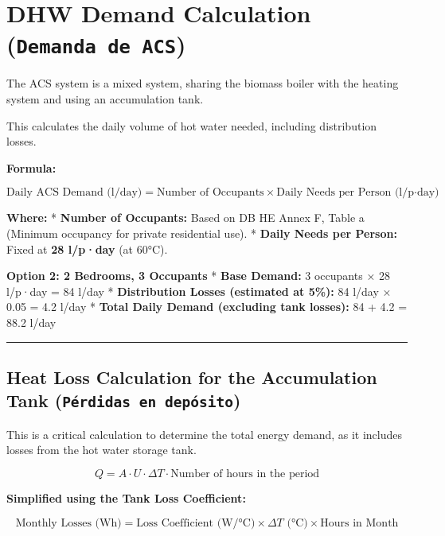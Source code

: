 \documentclass[
  10pt,
  letterpaper,
]{scrbook}
\begin{document}

\chapter{\texorpdfstring{DHW Demand Calculation
(\texttt{Demanda\ de\ ACS})}{DHW Demand Calculation (Demanda de ACS)}}\label{dhw-demand-calculation-demanda-de-acs}

The ACS system is a mixed system, sharing the biomass boiler with the
heating system and using an accumulation tank.

This calculates the daily volume of hot water needed, including
distribution losses.

\textbf{Formula:}

\[\text{Daily ACS Demand (l/day)} = \text{Number of Occupants} \times \text{Daily Needs per Person (l/p·day)}\]

\textbf{Where:} * \textbf{Number of Occupants:} Based on DB HE Annex F,
Table a (Minimum occupancy for private residential use). * \textbf{Daily
Needs per Person:} Fixed at \textbf{28 l/p·day} (at 60°C).

\textbf{Option 2: 2 Bedrooms, 3 Occupants} * \textbf{Base Demand:} 3
occupants × 28 l/p·day = 84 l/day * \textbf{Distribution Losses
(estimated at 5\%):} 84 l/day × 0.05 = 4.2 l/day * \textbf{Total Daily
Demand (excluding tank losses):} 84 + 4.2 = 88.2 l/day

\begin{center}\rule{0.5\linewidth}{0.5pt}\end{center}

\section{\texorpdfstring{Heat Loss Calculation for the Accumulation Tank
(\texttt{Pérdidas\ en\ depósito})}{Heat Loss Calculation for the Accumulation Tank (Pérdidas en depósito)}}\label{heat-loss-calculation-for-the-accumulation-tank-puxe9rdidas-en-depuxf3sito}

This is a critical calculation to determine the total energy demand, as
it includes losses from the hot water storage tank.

\[Q = A \cdot U \cdot \Delta T \cdot \text{Number of hours in the period}\]

\textbf{Simplified using the Tank Loss Coefficient:}

\[\text{Monthly Losses (Wh)} = \text{Loss Coefficient (W/°C)} \times \Delta T \text{ (°C)} \times \text{Hours in Month}\]
\end{document}
